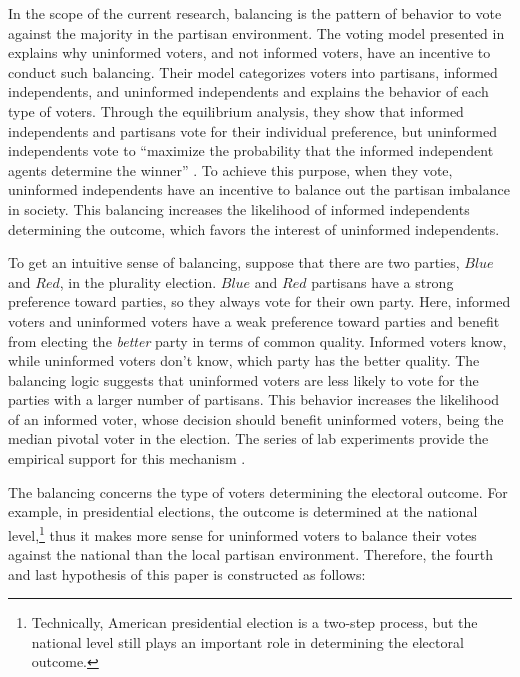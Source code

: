 \documentclass[letterpaper, 12pt]{article}
\begin{document}
    \par In the scope of the current research, balancing is the pattern of behavior to vote against the majority in the partisan environment. The voting model presented in \cite{Feddersen1996thsw} explains why uninformed voters, and not informed voters, have an incentive to conduct such balancing. Their model categorizes voters into partisans, informed independents, and uninformed independents and explains the behavior of each type of voters. Through the equilibrium analysis, they show that informed independents and partisans vote for their individual preference, but uninformed independents vote to ``maximize the probability that the informed independent agents determine the winner'' \citep[][p.414]{Feddersen1996thsw}. To achieve this purpose, when they vote, uninformed independents have an incentive to balance out the partisan imbalance in society. This balancing increases the likelihood of informed independents determining the outcome, which favors the interest of uninformed independents. 

    \par To get an intuitive sense of balancing, suppose that there are two parties, $Blue$ and $Red$, in the plurality election. $Blue$ and $Red$ partisans have a strong preference toward parties, so they always vote for their own party. Here, informed voters and uninformed voters have a weak preference toward parties and benefit from electing the \textit{better} party in terms of common quality. Informed voters know, while uninformed voters don't know, which party has the better quality. The balancing logic suggests that uninformed voters are less likely to vote for the parties with a larger number of partisans. This behavior increases the likelihood of an informed voter, whose decision should benefit uninformed voters, being the median pivotal voter in the election. The series of lab experiments provide the empirical support for this mechanism \citep{Battaglini2008inag, Battaglini2010thsw}.
    
    \par The balancing concerns the type of voters determining the electoral outcome. For example, in presidential elections, the outcome is determined at the national level,\footnote{Technically, American presidential election is a two-step process, but the national level still plays an important role in determining the electoral outcome.} thus it makes more sense for uninformed voters to balance their votes against the national than the local partisan environment. Therefore, the fourth and last hypothesis of this paper is constructed as follows:
\end{document}

